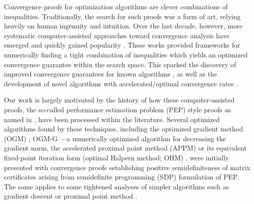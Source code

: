 \documentclass{article}
\theoremstyle{definition}
\theoremstyle{plain}
\begin{document}
Convergence proofs for optimization algorithms are clever combinations of inequalities.
Traditionally, the search for such proofs was a form of art, relying heavily on human ingenuity and intuition.
Over the last decade, however, more systematic computer-assisted approaches toward convergence analysis have emerged and quickly gained popularity \citep{DroriTeboulle2014_performance,TaylorHendrickxGlineur2017_smooth,TaylorBach2019_stochastic}.
These works provided frameworks for numerically finding a tight combination of inequalities which yields an optimized convergence guarantee within the search space.
This sparked the discovery of improved convergence guarantees for known algorithms \citep{DroriTeboulle2014_performance, TaylorBach2019_stochastic, guTightSublinearConvergence2020, GuYang2025_tight}, as well as the development of novel algorithms with accelerated/optimal convergence rates \citep{KimFessler2016_optimized, DroriTaylor2020_efficient, KimFessler2021_optimizing, Lieder2021_convergence, Kim2021_accelerated, YoonRyu2021_accelerated, LeeKim2021_fast, ParkRyu2022_exact, TaylorDrori2023_optimal, JangGuptaRyu2025_computerassisted}.

Our work is largely motivated by the history of how these computer-assisted proofs, the so-called performance estimation problem (PEP) style proofs as named in \citep{TaylorHendrickxGlineur2017_smooth}, have been processed within the literature.
Several optimized algorithms found by these techniques, including the optimized gradient method (OGM) \citep{KimFessler2016_optimized}, OGM-G \citep{KimFessler2021_optimizing}---a numerically optimized algorithm for decreasing the gradient norm, the accelerated proximal point method (APPM) \citep{Kim2021_accelerated} or its equivalent fixed-point iteration form (optimal Halpern method; OHM) \citep{Lieder2021_convergence},
were initially presented with convergence proofs establishing positive semidefiniteness of matrix certificates arising from semidefinite programming (SDP) formulation of PEP.
The same applies to some tightened analyses of simpler algorithms such as gradient descent \citep{DroriTeboulle2014_performance, altschulerAccelerationStepsizeHedging2025, altschulerAccelerationStepsizeHedging2025a, grimmerAcceleratedObjectiveGap2025} or proximal point method \citep{guTightSublinearConvergence2020,GuYang2025_tight}.
\end{document}
